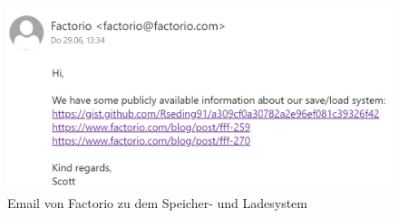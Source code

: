 \begin{figure}[htp]
    \centering
    \includegraphics[width=1\textwidth]{images/Factorio_Email.png}
    \caption{Email von Factorio zu dem Speicher- und Ladesystem}
    \label{fig:factorioMail}
\end{figure}

